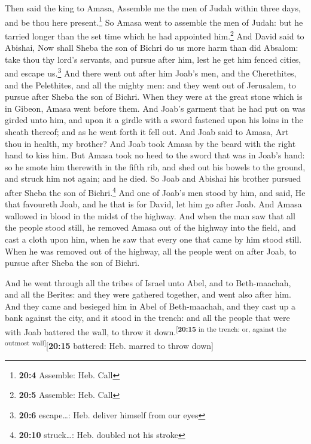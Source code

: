  Then said the king to Amasa, Assemble me the men of Judah
within three days, and be thou here present.\footnote{\textbf{20:4}
  Assemble: Heb. Call}  So Amasa went to assemble the men
of Judah: but he tarried longer than the set time which he had appointed
him.\footnote{\textbf{20:5} Assemble: Heb. Call}  And
David said to Abishai, Now shall Sheba the son of Bichri do us more harm
than did Absalom: take thou thy lord's servants, and pursue after him,
lest he get him fenced cities, and escape us.\footnote{\textbf{20:6}
  escape\ldots: Heb. deliver himself from our eyes}  And
there went out after him Joab's men, and the Cherethites, and the
Pelethites, and all the mighty men: and they went out of Jerusalem, to
pursue after Sheba the son of Bichri.  When they were at
the great stone which is in Gibeon, Amasa went before them. And Joab's
garment that he had put on was girded unto him, and upon it a girdle
with a sword fastened upon his loins in the sheath thereof; and as he
went forth it fell out.  And Joab said to Amasa, Art thou
in health, my brother? And Joab took Amasa by the beard with the right
hand to kiss him.  But Amasa took no heed to the sword
that was in Joab's hand: so he smote him therewith in the fifth rib, and
shed out his bowels to the ground, and struck him not again; and he
died. So Joab and Abishai his brother pursued after Sheba the son of
Bichri.\footnote{\textbf{20:10} struck\ldots: Heb. doubled not his
  stroke}  And one of Joab's men stood by him, and said,
He that favoureth Joab, and he that is for David, let him go after Joab.
 And Amasa wallowed in blood in the midst of the highway.
And when the man saw that all the people stood still, he removed Amasa
out of the highway into the field, and cast a cloth upon him, when he
saw that every one that came by him stood still.  When he
was removed out of the highway, all the people went on after Joab, to
pursue after Sheba the son of Bichri.

 And he went through all the tribes of Israel unto Abel,
and to Beth-maachah, and all the Berites: and they were gathered
together, and went also after him.  And they came and
besieged him in Abel of Beth-maachah, and they cast up a bank against
the city, and it stood in the trench: and all the people that were with
Joab battered the wall, to throw it
down.\textsuperscript{{[}\textbf{20:15} in the trench: or, against the
outmost wall{]}}{[}\textbf{20:15} battered: Heb. marred to throw down{]}

